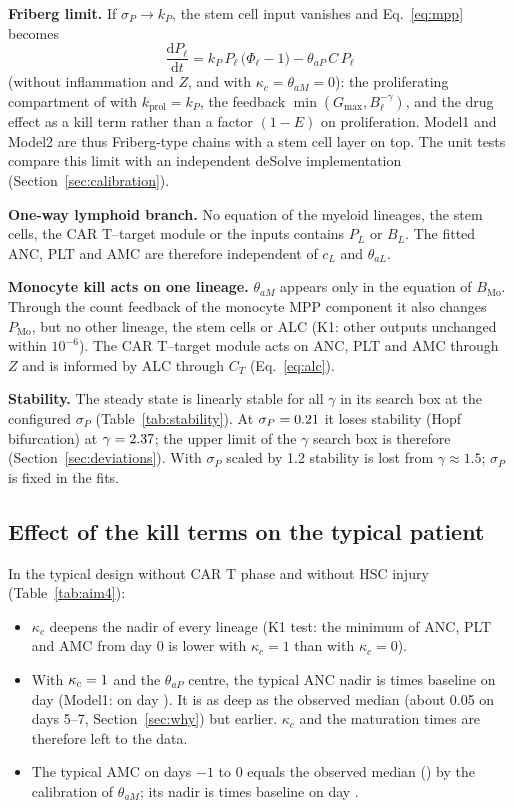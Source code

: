 \documentclass[11pt]{article}
\newcommand{\dd}{\mathrm{d}}
\begin{document}
\textbf{Friberg limit.} If $\sigma_P\to k_P$, the stem cell input vanishes and Eq.~\ref{eq:mpp} becomes
\begin{equation*}
\frac{\dd P_\ell}{\dd t} = k_P\,P_\ell\,\bigl(\Phi_\ell-1\bigr) - \theta_{aP}\,C\,P_\ell
\end{equation*}
(without inflammation and $Z$, and with $\kappa_c=\theta_{aM}=0$): the proliferating compartment of \citet{friberg2002} with $k_{\mathrm{prol}}=k_P$, the feedback $\min(G_{\max},B_\ell^{-\gamma})$, and the drug effect as a kill term rather than a factor $(1-E)$ on proliferation. Model1 and Model2 are thus Friberg-type chains with a stem cell layer on top. The unit tests compare this limit with an independent deSolve implementation (Section~\ref{sec:calibration}).

\textbf{One-way lymphoid branch.} No equation of the myeloid lineages, the stem cells, the CAR T--target module or the inputs contains $P_L$ or $B_L$. The fitted ANC, PLT and AMC are therefore independent of $c_L$ and $\theta_{aL}$.

\textbf{Monocyte kill acts on one lineage.} $\theta_{aM}$ appears only in the equation of $B_{\mathrm{Mo}}$. Through the count feedback of the monocyte MPP component it also changes $P_{\mathrm{Mo}}$, but no other lineage, the stem cells or ALC (K1: other outputs unchanged within $10^{-6}$). The CAR T--target module acts on ANC, PLT and AMC through $Z$ and is informed by ALC through $C_T$ (Eq.~\ref{eq:alc}).

\textbf{Stability.} The steady state is linearly stable for all $\gamma$ in its search box at the configured $\sigma_P$ (Table~\ref{tab:stability}). At $\sigma_P=0.21$ it loses stability (Hopf bifurcation) at $\gamma=2.37$; the upper limit of the $\gamma$ search box is therefore \valGammaHi{} (Section~\ref{sec:deviations}). With $\sigma_P$ scaled by 1.2 stability is lost from $\gamma\approx1.5$; $\sigma_P$ is fixed in the fits.

\subsection{Effect of the kill terms on the typical patient}\label{sec:kill}
In the typical design without CAR T phase and without HSC injury (Table~\ref{tab:aim4}):
\begin{itemize}
\item $\kappa_c$ deepens the nadir of every lineage (K1 test: the minimum of ANC, PLT and AMC from day 0 is lower with $\kappa_c=1$ than with $\kappa_c=0$).
\item With $\kappa_c=1$ and the $\theta_{aP}$ centre, the typical ANC nadir is \valAncNadirModel{} times baseline on day \valAncNadirDayModel{} (Model1: \valAncNadirModelOne{} on day \valAncNadirDayModelOne). It is as deep as the observed median (about 0.05 on days 5--7, Section~\ref{sec:why}) but earlier. $\kappa_c$ and the maturation times are therefore left to the data.
\item The typical AMC on days $-1$ to 0 equals the observed median (\valAmcTarget) by the calibration of $\theta_{aM}$; its nadir is \valAmcNadirModel{} times baseline on day \valAmcNadirDayModel.
\end{itemize}
\end{document}
